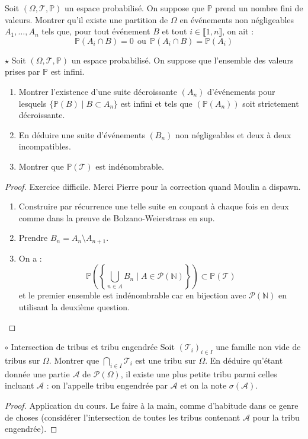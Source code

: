 \documentclass[french,a4paper]{article}
\renewcommand{\P}{\mathbb{P}}
\newcommand{\N}{\mathbb{N}}
\theoremstyle{plain}
\theoremstyle{definition}
\theoremstyle{remark}
\begin{document}
\begin{ex}{}
	Soit $(\Omega,\mathcal{T},\P)$ un espace probabilisé. On suppose que $\P$ prend un nombre fini de valeurs. Montrer qu'il existe une partition de $\Omega$ en événements non négligeables $A_1,\ldots,A_n$ tels que, pour tout événement $B$ et tout $i\in\llbracket1,n\rrbracket$, on ait : $$\P(A_i\cap B)=0\ \ \text{ou}\ \ \P(A_i\cap B)=\P(A_i)$$
\end{ex}

\begin{ex}{$\star$}
	Soit $(\Omega,\mathcal{T},\P)$ un espace probabilisé. On suppose que l'ensemble des valeurs prises par $\P$ est infini.
	\begin{enumerate}
		\item Montrer l'existence d'une suite décroissante $(A_n)$ d'événements pour lesquels $\{\P(B)\mid B\subset A_n\}$ est infini et tels que $(\P(A_n))$ soit strictement décroissante.
		\item En déduire une suite d'événements $(B_n)$ non négligeables et deux à deux incompatibles.
		\item Montrer que $\P(\mathcal{T})$ est indénombrable.
	\end{enumerate}
\end{ex}
\begin{proof}
	Exercice difficile. Merci Pierre pour la correction quand Moulin a dispawn.
	\begin{enumerate}
		\item Construire par récurrence une telle suite en coupant à chaque fois en deux comme dans la preuve de Bolzano-Weierstrass en sup.
		\item Prendre $B_n=A_{n}\setminus A_{n+1}$.
		\item On a : $$\P\left(\left\{\bigcup_{n\in A}B_n\mid A\in\mathcal{P}(\N)\right\}\right)\subset\P(\mathcal{T})$$ et le premier ensemble est indénombrable car en bijection avec $\mathcal{P}(\N)$ en utilisant la deuxième question.
	\end{enumerate}
\end{proof}

\begin{ex}{$\circ$ Intersection de tribus et tribu engendrée}
	Soit $\left(\mathcal{T}_i\right)_{i\in I}$ une famille non vide de tribus sur $\Omega$. Montrer que $\displaystyle\bigcap_{i\in I}\mathcal{T}_i$ est une tribu sur $\Omega$. En déduire qu'étant donnée une partie $\mathcal{A}$ de $\mathcal{P}(\Omega)$, il existe une plus petite tribu parmi celles incluant $\mathcal{A}$ : on l'appelle tribu engendrée par $\mathcal{A}$ et on la note $\sigma(\mathcal{A})$.
\end{ex}
\begin{proof}
	Application du cours. Le faire à la main, comme d'habitude dans ce genre de choses (considérer l'intersection de toutes les tribus contenant $\mathcal{A}$ pour la tribu engendrée).
\end{proof}
\end{document}
